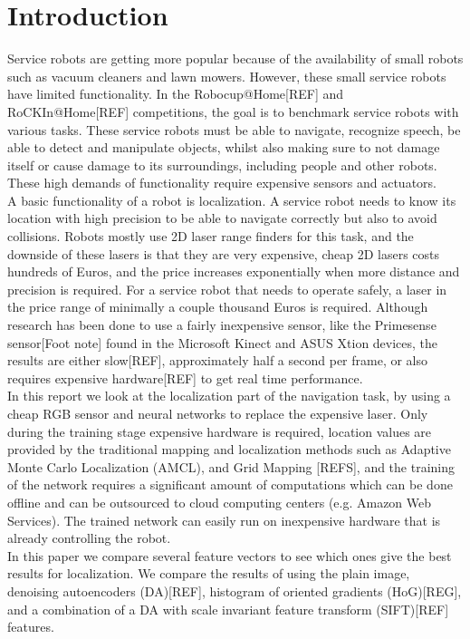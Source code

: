 \section{Introduction}
Service robots are getting more popular because of the availability of small robots such as vacuum cleaners and lawn mowers.
However, these small service robots have limited functionality. In the Robocup@Home[REF] and  \\ RoCKIn@Home[REF] competitions, the goal is to benchmark service robots with various tasks. 
These service robots must be able to navigate, recognize speech, be able to detect and manipulate objects, whilst also making sure to not damage itself or cause damage to its surroundings,
including people and other robots. These high demands of functionality require expensive sensors and actuators. \\
A basic functionality of a robot is localization. A service robot needs to know its location with high precision to be able to navigate correctly but also to avoid collisions. Robots mostly use 2D laser range finders for this task,
and the downside of these lasers is that they are very expensive, cheap 2D lasers costs hundreds of Euros, and the price increases exponentially when more distance and precision is required. For a service robot that needs
to operate safely, a laser in the price range of minimally a couple thousand Euros is required. Although research has been done to use a fairly inexpensive sensor, 
like the Primesense sensor[Foot note] found in the Microsoft Kinect and ASUS Xtion devices, the results are either slow[REF], approximately half a second per frame, or also requires expensive hardware[REF] to get real time performance. \\
In this report we look at the localization part of the navigation task, by using a cheap RGB sensor and neural networks to replace the expensive laser. Only during the training stage expensive hardware is required, location values are 
provided by the traditional mapping and localization methods such as Adaptive Monte Carlo Localization (AMCL), and Grid Mapping [REFS], and the training of the network requires a significant amount of computations which can be done offline
and can be outsourced to cloud computing centers (e.g. Amazon Web Services). The trained network can easily run on inexpensive hardware that is already controlling the robot.  \\
In this paper we compare several feature vectors to see which ones give the best results for localization. We compare the results of using the plain image, denoising autoencoders (DA)[REF], histogram of oriented gradients (HoG)[REG], and a combination of a DA with 
scale invariant feature transform (SIFT)[REF] features.   

